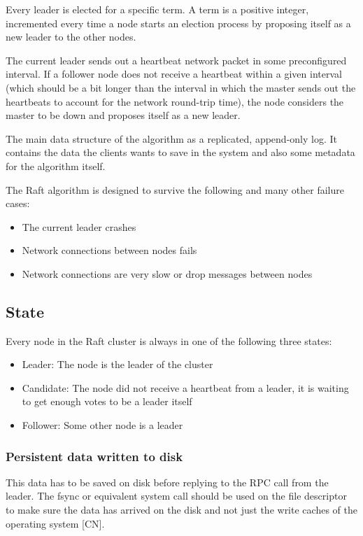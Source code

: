 Every leader is elected for a specific term. A term is a positive integer, incremented every time a node starts an election process by proposing itself as a new leader to the other nodes.

The current leader sends out a heartbeat network packet in some preconfigured interval. If a follower node does not receive a heartbeat within a given interval (which should be a bit longer than the interval in which the master sends out the heartbeats to account for the network round-trip time), the node considers the master to be down and proposes itself as a new leader.

The main data structure of the algorithm as a replicated, append-only log. It contains the data the clients wants to save in the system and also some metadata
for the algorithm itself.

The Raft algorithm is designed to survive the following and many other failure cases:
\begin{itemize}
    \item The current leader crashes
    \item Network connections between nodes fails
    \item Network connections are very slow or drop messages between nodes
\end{itemize}

\subsection{State}
Every node in the Raft cluster is always in one of the following three states:
\begin{itemize}
    \item Leader: The node is the leader of the cluster
    \item Candidate: The node did not receive a heartbeat from a leader, it is waiting to get enough votes to be a leader itself
    \item Follower: Some other node is a leader
\end{itemize}

\subsubsection*{Persistent data written to disk}

This data has to be saved on disk before replying to the RPC call from the leader. The fsync or equivalent system call should be used on the file descriptor to make sure the data has arrived on the disk and not just the write caches of the operating system [CN].

